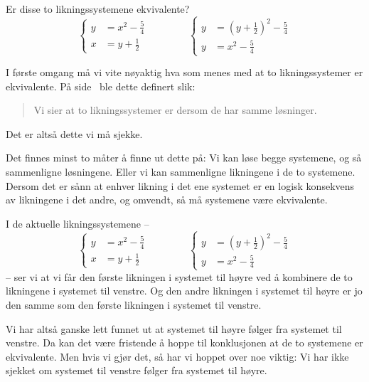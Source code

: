 \begin{oppgave}
Er disse to likningssystemene ekvivalente?
\[
\left\{
\begin{aligned}
  y &= x^2 - \tfrac{5}{4} \\
  x &= y + \tfrac{1}{2}
\end{aligned}
\right.
\qquad\qquad
\left\{
\begin{aligned}
  y &= \left( y + \tfrac{1}{2} \right)^2 - \tfrac{5}{4} \\
  y &= x^2 - \tfrac{5}{4}
\end{aligned}
\right.
\]
\end{oppgave}

\begin{losning}
I første omgang må vi vite nøyaktig hva som menes med at to
likningssystemer er ekvivalente.  På side~\pageref{def:ekvivalente}
ble dette definert slik:
\begin{quote}
Vi sier at to likningssystemer er  dersom de har
samme løsninger.
\end{quote}
Det er altså dette vi må sjekke.

Det finnes minst to måter å finne ut dette på: Vi kan løse begge
systemene, og så sammenligne løsningene.  Eller vi kan sammenligne
likningene i de to systemene.  Dersom det er sånn at enhver likning i
det ene systemet er en logisk konsekvens av likningene i det andre, og
omvendt, så må systemene være ekvivalente.

I de aktuelle likningssystemene --
\[
\left\{
\begin{aligned}
  y &= x^2 - \tfrac{5}{4} \\
  x &= y + \tfrac{1}{2}
\end{aligned}
\right.
\qquad\qquad
\left\{
\begin{aligned}
  y &= \left( y + \tfrac{1}{2} \right)^2 - \tfrac{5}{4} \\
  y &= x^2 - \tfrac{5}{4}
\end{aligned}
\right.
\]
-- ser vi at vi får den første likningen i systemet til høyre ved å
kombinere de to likningene i systemet til venstre.  Og den andre
likningen i systemet til høyre er jo den samme som den første likningen
i systemet til venstre.

Vi har altså ganske lett funnet ut at systemet til høyre følger fra
systemet til venstre.  Da kan det være fristende å hoppe til
konklusjonen at de to systemene er ekvivalente.  Men hvis vi gjør det,
så har vi hoppet over noe viktig: Vi har ikke sjekket om systemet til
venstre følger fra systemet til høyre.


\end{losning}
